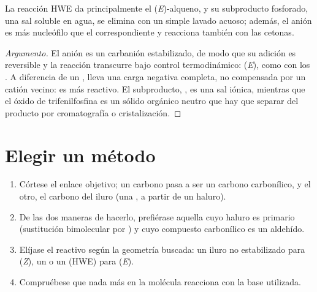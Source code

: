 \begin{proposition}\label{prop:b2:wittig:hwe}
La reacción HWE da principalmente el (\textit{E})-alqueno, y su subproducto fosforado, una sal soluble en agua,
se elimina con un simple lavado acuoso; además, el anión  es más nucleófilo que el
 correspondiente y reacciona también con las cetonas.
\end{proposition}

\begin{proof}[Argumento]
El anión  es un carbanión estabilizado, de modo que su adición es reversible y la reacción transcurre
bajo control termodinámico: (\textit{E}), como con los . A diferencia de un ,
lleva una carga negativa completa, no compensada por un catión vecino: es más reactivo. El
subproducto, , es una sal iónica, mientras que el óxido de trifenilfosfina es un sólido orgánico
neutro que hay que separar del producto por cromatografía o cristalización.
\end{proof}

\section{Elegir un método}

\begin{method}\label{met:b2:wittig:wittig-disconnection}
\begin{enumerate}
  \item Córtese el enlace  objetivo; un carbono pasa a ser un carbono carbonílico, y el otro, el carbono del iluro
        (una , a partir de un haluro).
  \item De las dos maneras de hacerlo, prefiérase aquella cuyo haluro es primario (sustitución bimolecular por
        ) y cuyo compuesto carbonílico es un aldehído.
  \item Elíjase el reactivo según la geometría buscada: un iluro no estabilizado para (\textit{Z}), un
         o un  (HWE) para (\textit{E}).
  \item Compruébese que nada más en la molécula reacciona con la base utilizada.
\end{enumerate}
\end{method}

